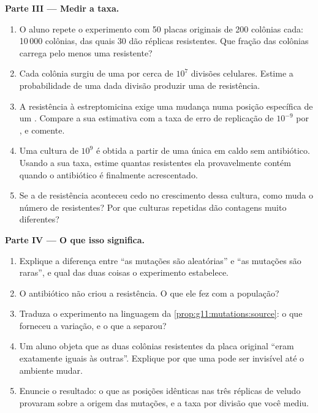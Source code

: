 \begin{problem}
\medskip
\noindent\textbf{Parte III --- Medir a taxa.}
\begin{enumerate}[resume]
  \item O aluno repete o experimento com 50 placas originais de 200
        colônias cada: 10\,000 colônias, das quais 30 dão réplicas
        resistentes. Que fração das colônias carrega pelo menos uma
         resistente?
  \item Cada colônia surgiu de uma  por cerca de $10^7$ divisões
        celulares. Estime a probabilidade de uma dada divisão produzir
        uma  de resistência.
  \item A resistência à estreptomicina exige uma mudança numa posição
        específica de um . Compare a sua estimativa com a taxa de
        erro de replicação de $10^{-9}$ por , e comente.
  \item Uma cultura de $10^9$  é obtida a partir de uma única
         em caldo sem antibiótico. Usando a sua taxa, estime
        quantas  resistentes ela provavelmente contém quando o
        antibiótico é finalmente acrescentado.
  \item Se a  de resistência aconteceu cedo no crescimento
        dessa cultura, como muda o número de  resistentes? Por
        que culturas repetidas dão contagens muito diferentes?
\end{enumerate}

\medskip
\noindent\textbf{Parte IV --- O que isso significa.}
\begin{enumerate}[resume]
  \item Explique a diferença entre ``as mutações são aleatórias'' e
        ``as mutações são raras'', e qual das duas coisas o
        experimento estabelece.
  \item O antibiótico não criou a resistência. O que ele fez com a
        população?
  \item Traduza o experimento na linguagem da
        \cref{prop:g11:mutations:source}: o que forneceu a variação, e
        o que a separou?
  \item Um aluno objeta que as duas colônias resistentes da placa
        original ``eram exatamente iguais às outras''. Explique por
        que uma  pode ser invisível até o ambiente mudar.
  \item Enuncie o resultado: o que as posições idênticas nas três
        réplicas de veludo provaram sobre a origem das mutações, e a
        taxa por divisão que você mediu.
\end{enumerate}
\end{problem}
